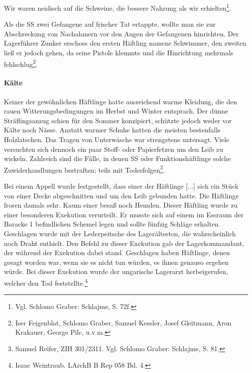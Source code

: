 \documentclass[a4paper,12pt,ngerman,
]{nisebook}
\begin{document}
\begin{leftbar}
Wir waren neidisch auf die Schweine, die bessere Nahrung als wir erhielten\footnote{Vgl. Schlomo Graber: Schlajme, S. 72f.}.
\end{leftbar}

Als die SS zwei Gefangene auf frischer Tat ertappte, wollte man sie zur Abschreckung von Nachahmern vor den Augen der Gefangenen hinrichten. Der Lagerführer Zunker erschoss den ersten Häftling namens Schwimmer, den zweiten ließ er jedoch gehen, da seine Pistole klemmte und die Hinrichtung mehrmals fehlschlug\footnote{Iser Feigenblat, Schlomo Graber, Samuel Kessler, Josef Gleitmann, Aron Krakauer, George Pilc, u.v.m.}.

\paragraph{Kälte}
Keiner der gewöhnlichen Häftlinge hatte ausreichend warme Kleidung, die den rauen Witterungsbedingungen im Herbst und Winter entsprach. Der dünne Sträflingsanzug schien für den Sommer konzipiert, schützte jedoch weder vor Kälte noch Nässe. Anstatt warmer Schuhe hatten die meisten bestenfalls Holzlatschen. Das Tragen von Unterwäsche war strengstens untersagt. Viele versuchten sich dennoch ein paar Stoff- oder Papierfetzen um den Leib zu wickeln. Zahlreich sind die Fälle, in denen SS oder Funktionshäftlinge solche Zuwiderhandlungen bestraften; teils mit Todesfolgen\footnote{Samuel Reifer, ZIH 301/2311. Vgl. Schlomo Graber: Schlajme, S. 81.}.

\begin{leftbar}
Bei einem Appell wurde festgestellt, dass einer der Häftlinge [...] sich ein Stück von einer Decke abgeschnitten und um den Leib gebunden hatte. Die Häftlinge froren damals sehr. Kaum einer besaß noch Hemden. Dieser Häftling wurde zu einer besonderen Exekution verurteilt. Er musste sich auf einem im Essraum der Baracke 1 befindlichen Schemel legen und sollte fünfzig Schläge erhalten. Geschlagen wurde mit der Lederpeitsche des Lagerältesten, die wahrscheinlich noch Draht enthielt. Den Befehl zu dieser Exekution gab der Lagerkommandant, der während der Exekution dabei stand. Geschlagen haben Häftlinge, denen gesagt worden war, wenn sie es nicht tun würden, es ihnen genauso ergehen würde. Bei dieser Exekution wurde der ungarische Lagerarzt herbeigerufen, welcher den Tod feststellte.\footnote{Isaac Weintraub. LArchB B Rep 058 Bd. 4.}
\end{leftbar}
\end{document}
